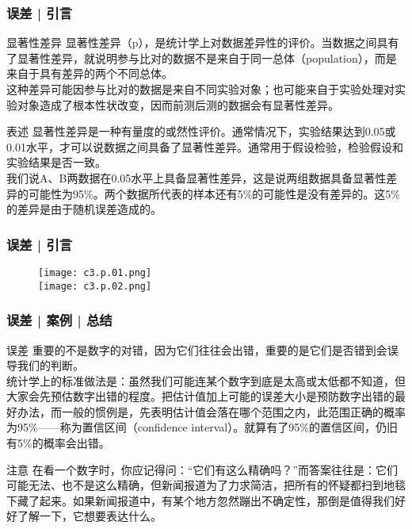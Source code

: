 \begin{frame}
  \frametitle{误差 | 引言}
  \begin{block}{显著性差异}
显著性差异（p），是统计学上对数据差异性的评价。当数据之间具有了显著性差异，就说明参与比对的数据不是来自于同一总体（population），而是来自于具有差异的两个不同总体。\\
\vspace{0.3em}
  这种差异可能因参与比对的数据是来自不同实验对象；也可能来自于实验处理对实验对象造成了根本性状改变，因而前测后测的数据会有显著性差异。
  \end{block}
  \pause
  \begin{block}{表述}
    显著性差异是一种有量度的或然性评价。通常情况下，实验结果达到0.05或0.01水平，才可以说数据之间具备了显著性差异。通常用于假设检验，检验假设和实验结果是否一致。\\
    \vspace{0.3em}
我们说A、B两数据在0.05水平上具备显著性差异，这是说两组数据具备显著性差异的可能性为95\%。两个数据所代表的样本还有5\%的可能性是没有差异的。这5\%的差异是由于随机误差造成的。\\
  \end{block}
\end{frame}

\begin{frame}
  \frametitle{误差 | 引言}
  \begin{figure}
    \centering
    \texttt{[image: c3.p.01.png]}\\
    \texttt{[image: c3.p.02.png]}
  \end{figure}
\end{frame}

\begin{frame}
  \frametitle{误差 | 案例 | 总结}
  \begin{block}{误差}
    重要的不是数字的对错，因为它们往往会出错，重要的是它们是否错到会误导我们的判断。\\
    \vspace{0.3em}
统计学上的标准做法是：虽然我们可能连某个数字到底是太高或太低都不知道，但大家会先预估数字出错的程度。把估计值加上可能的误差大小是预防数字出错的最好办法，而一般的惯例是，先表明估计值会落在哪个范围之内，此范围正确的概率为95\%——称为置信区间（confidence interval）。就算有了95\%的置信区间，仍旧有5\%的概率会出错。
  \end{block}
  \pause
  \begin{block}{注意}
在看一个数字时，你应记得问：“它们有这么精确吗？”而答案往往是：它们可能无法、也不是这么精确，但新闻报道为了力求简洁，把所有的怀疑都扫到地毯下藏了起来。如果新闻报道中，有某个地方忽然蹦出不确定性，那倒是值得我们好好了解一下，它想要表达什么。
  \end{block}
\end{frame}

